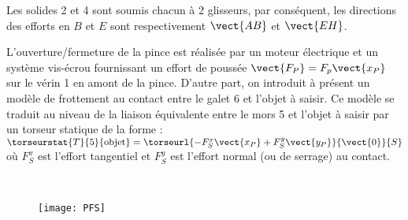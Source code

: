 
\ifprof
\begin{corrige}
Les solides 2 et 4 sont soumis chacun à 2 glisseurs, par conséquent, les directions des efforts  en $B$ et $E$ sont respectivement $\vect{AB}$ et $\vect{EH}$.
\end{corrige}
\else
\fi

\ifprof\else
L'ouverture/fermeture de la pince est réalisée par un moteur électrique et un système vis-écrou
fournissant un effort de poussée $\vect{F_P}=F_p\vect{x_P}$ sur le vérin 1 en amont de la pince. D'autre part, on
introduit à présent un modèle de frottement au contact entre le galet 6 et l'objet à saisir. Ce modèle
se traduit au niveau de la liaison équivalente entre le mors 5 et l'objet à saisir par un torseur
statique de la forme : $\torseurstat{T}{5}{\text{objet}}=\torseurl{-F_S^x\vect{x_P}+F_S^y\vect{y_P}}{\vect{0}}{S}$ 
où $F_S^x$ est l'effort tangentiel et $F_S^y$ est l'effort normal (ou de serrage) au contact.
\fi



\ifprof
\begin{corrige}~\\
\begin{figure}[H]
\centering
{\texttt{[image: PFS]}}
\end{figure}

\end{corrige}
\else
\fi

